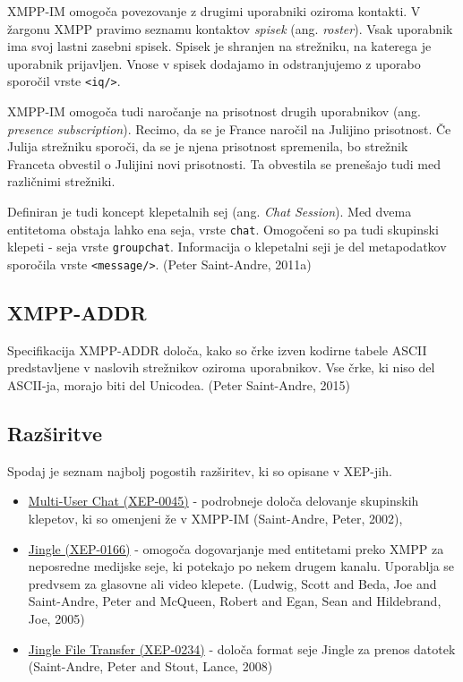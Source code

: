 \documentclass[11pt]{article}
\begin{document}
XMPP-IM omogoča povezovanje z drugimi uporabniki oziroma kontakti. V
žargonu XMPP pravimo seznamu kontaktov \emph{spisek} (ang. \emph{roster}). Vsak
uporabnik ima svoj lastni zasebni spisek. Spisek je shranjen na
strežniku, na katerega je uporabnik prijavljen. Vnose v spisek
dodajamo in odstranjujemo z uporabo sporočil vrste \texttt{<iq/>}.

XMPP-IM omogoča tudi naročanje na prisotnost drugih uporabnikov
(ang. \emph{presence subscription}). Recimo, da se je France naročil na
Julijino prisotnost. Če Julija strežniku sporoči, da se je njena
prisotnost spremenila, bo strežnik Franceta obvestil o Julijini novi
prisotnosti. Ta obvestila se prenešajo tudi med različnimi strežniki.

Definiran je tudi koncept klepetalnih sej (ang. \emph{Chat Session}). Med
dvema entitetoma obstaja lahko ena seja, vrste \texttt{chat}. Omogočeni so
pa tudi skupinski klepeti - seja vrste \texttt{groupchat}. Informacija o
klepetalni seji je del metapodatkov sporočila vrste
\texttt{<message/>}. (Peter Saint-Andre, 2011a)

\subsection{XMPP-ADDR}
\label{sec:org1b92f2e}

Specifikacija XMPP-ADDR določa, kako so črke izven kodirne tabele
ASCII predstavljene v naslovih strežnikov oziroma uporabnikov. Vse
črke, ki niso del ASCII-ja, morajo biti del Unicodea. (Peter Saint-Andre, 2015)

\subsection{Razširitve}
\label{sec:orgb93111e}

Spodaj je seznam najbolj pogostih razširitev, ki so opisane v XEP-jih.

\begin{itemize}
\item \href{https://xmpp.org/extensions/xep-0045.html}{Multi-User Chat (XEP-0045)} - podrobneje določa delovanje skupinskih
klepetov, ki so omenjeni že v XMPP-IM (Saint-Andre, Peter, 2002),
\item \href{https://xmpp.org/extensions/xep-0166.html}{Jingle (XEP-0166)} - omogoča dogovarjanje med entitetami preko XMPP
za neposredne medijske seje, ki potekajo po nekem drugem
kanalu. Uporablja se predvsem za glasovne ali video
klepete. (Ludwig, Scott and Beda, Joe and Saint-Andre, Peter and McQueen, Robert and Egan, Sean and Hildebrand, Joe, 2005)
\item \href{https://xmpp.org/extensions/xep-0234.html}{Jingle File Transfer (XEP-0234)} - določa format seje Jingle za
prenos datotek (Saint-Andre, Peter and Stout, Lance, 2008)
\end{itemize}
\end{document}
